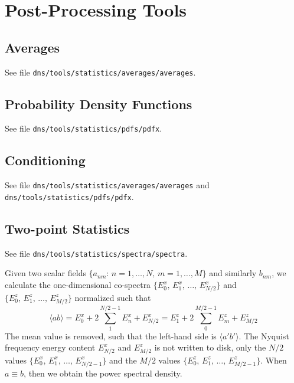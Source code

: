 \chapter{Post-Processing Tools}\label{sec:postprocessing}

\section{Averages}

See file {\tt dns/tools/statistics/averages/averages}.

\section{Probability Density Functions}

See file {\tt dns/tools/statistics/pdfs/pdfx}.

\section{Conditioning}

See file {\tt dns/tools/statistics/averages/averages} and {\tt
  dns/tools/statistics/pdfs/pdfx}.

\section{Two-point Statistics}
\sloppy

See file {\tt dns/tools/statistics/spectra/spectra}.

Given two scalar fields $\{a_{nm}:\,n=1,\ldots,N,\,m=1,\ldots,M\}$ and similarly
$b_{nm}$, we calculate the one-dimensional co-spectra
$\{E^x_0,\,E^x_1,\,\ldots,\,E^x_{N/2}\}$ and
$\{E^z_0,\,E^z_1,\,\ldots,\,E^z_{M/2}\}$ normalized such that
\begin{equation}
\langle ab\rangle = E^x_0+2\sum_1^{N/2-1}E^x_n+E^x_{N/2} = E^z_1+2\sum_0^{M/2-1}E^z_m+E^z_{M/2}
\end{equation}
The mean value is removed, such that the left-hand side is $\langle
a'b'\rangle$. The Nyquist frequency energy content $E^x_{N/2}$ and $E^z_{M/2}$
is not written to disk, only the $N/2$ values
$\{E^x_0,\,E^x_1,\,\ldots,\,E^x_{N/2-1}\}$ and the $M/2$ values
$\{E^z_0,\,E^z_1,\,\ldots,\,E^z_{M/2-1}\}$. When $a\equiv b$, then we obtain the
power spectral density.

